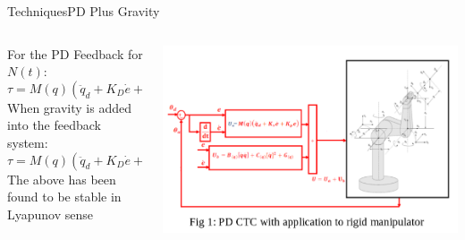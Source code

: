 \documentclass{beamer}
\begin{document}
\begin{frame}{Techniques}{PD Plus Gravity\cite{piltan}}
\begin{columns}
    \begin{column}{0.47\textwidth}
        For the PD Feedback for $N(t)$:
        \begin{equation*}
        \tau = M(q)(\ddot{q}_d + K_D\dot{e} + K_Pe) + N(q,\dot{q})
        \end{equation*}
        When gravity is added into the feedback system:
        \begin{equation*}
        \tau = M(q)(\ddot{q}_d + K_D\dot{e} + K_Pe) + G(q)
        \end{equation*}
        The above has been found to be stable in Lyapunov sense
    \end{column}
    \begin{column}{0.5\textwidth}
        \includegraphics[scale=.2]{./images/pd_ctc_application.png}
    \end{column}
\end{columns}
\end{frame}
\end{document}
